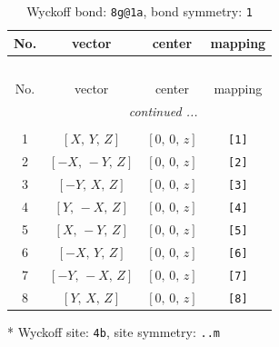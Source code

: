 \documentclass[fleqn,8pt]{jsarticle}
\begin{document}
\renewcommand{\arraystretch}{1.2}
\begin{longtable}{cccc}
\caption{Wyckoff bond: {\tt 8g@1a}, bond symmetry: {\tt 1}}
 \\
 \hline \hline
No. & vector & center & mapping \\ \hline \endfirsthead

\multicolumn{3}{l}{\tablename\ \thetable{}} \\
 \hline \hline
No. & vector & center & mapping \\ \hline \endhead

 \hline \hline
\multicolumn{3}{r}{\footnotesize\it continued ...} \\ \endfoot

 \hline \hline
\multicolumn{3}{r}{} \\ \endlastfoot

1 & $\left[ X,\, Y,\, Z \right]$ & $\left[ 0,\, 0,\, z \right]$ & {\tt [1]} \\ \hline
2 & $\left[ - X,\, - Y,\, Z \right]$ & $\left[ 0,\, 0,\, z \right]$ & {\tt [2]} \\ \hline
3 & $\left[ - Y,\, X,\, Z \right]$ & $\left[ 0,\, 0,\, z \right]$ & {\tt [3]} \\ \hline
4 & $\left[ Y,\, - X,\, Z \right]$ & $\left[ 0,\, 0,\, z \right]$ & {\tt [4]} \\ \hline
5 & $\left[ X,\, - Y,\, Z \right]$ & $\left[ 0,\, 0,\, z \right]$ & {\tt [5]} \\ \hline
6 & $\left[ - X,\, Y,\, Z \right]$ & $\left[ 0,\, 0,\, z \right]$ & {\tt [6]} \\ \hline
7 & $\left[ - Y,\, - X,\, Z \right]$ & $\left[ 0,\, 0,\, z \right]$ & {\tt [7]} \\ \hline
8 & $\left[ Y,\, X,\, Z \right]$ & $\left[ 0,\, 0,\, z \right]$ & {\tt [8]} \\
\end{longtable}
* Wyckoff site: {\tt 4b}, site symmetry: {\tt ..m}
\renewcommand{\arraystretch}{1.2}
\end{document}
